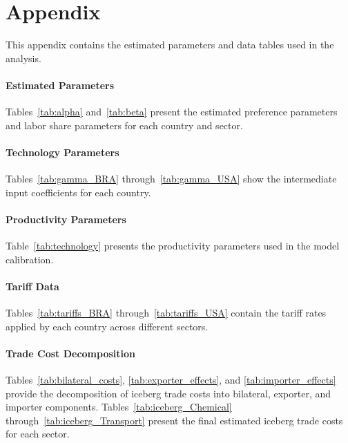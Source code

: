 \section*{Appendix}

This appendix contains the estimated parameters and data tables used in the analysis.

\paragraph{Estimated Parameters}
Tables~\ref{tab:alpha} and~\ref{tab:beta} present the estimated preference parameters and labor share parameters for each country and sector.

\paragraph{Technology Parameters}
Tables~\ref{tab:gamma_BRA} through~\ref{tab:gamma_USA} show the intermediate input coefficients for each country.

\paragraph{Productivity Parameters}
Table~\ref{tab:technology} presents the productivity parameters used in the model calibration.

\paragraph{Tariff Data}
Tables~\ref{tab:tariffs_BRA} through~\ref{tab:tariffs_USA} contain the tariff rates applied by each country across different sectors.

\paragraph{Trade Cost Decomposition}
Tables~\ref{tab:bilateral_costs}, \ref{tab:exporter_effects}, and \ref{tab:importer_effects} provide the decomposition of iceberg trade costs into bilateral, exporter, and importer components. Tables~\ref{tab:iceberg_Chemical} through~\ref{tab:iceberg_Transport} present the final estimated iceberg trade costs for each sector.


\begin{landscape}


\end{landscape}


